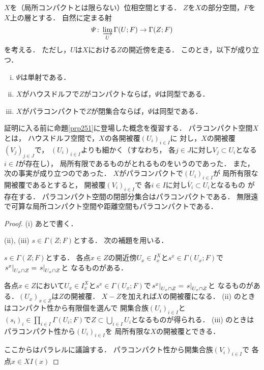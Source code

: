 \begin{PRP}\label{prp251}
    \(X\)を（局所コンパクトとは限らない）位相空間とする．
    \(Z\)を\(X\)の部分空間，\(F\)を\(X\)上の層とする．
    自然に定まる射
    \[
        \varPsi\colon\indlim[U]\Gamma(U;F)\to \Gamma(Z;F)
    \]
    を考える．
    ただし，\(U\)は\(X\)における\(Z\)の開近傍を走る．
    このとき，以下が成り立つ．
    \begin{enumerate}[(i)]
        \item \(\varPsi\)は単射である．
        \item \(X\)がハウスドルフで\(Z\)がコンパクトならば，\(\varPsi\)は同型である．
        \item \(X\)がパラコンパクトで\(Z\)が閉集合ならば，\(\varPsi\)は同型である．
    \end{enumerate}
\end{PRP}
証明に入る前に命題\ref{prp251}に登場した概念を復習する．
パラコンパクト空間\(X\)とは，
ハウスドルフ空間で，\(X\)の各開被覆\(\left(U_i\right)_{i\in I}\)に
対し，\(X\)の開被覆\(\left(V_j\right)_{j\in J}\)で，
\(\left(U_i\right)_{i\in I}\)よりも細かく（すなわち，
各\(j\in J\)に対し\(V_j\subset U_i\)となる\(i\in I\)が存在し），
局所有限であるものがとれるものをいうのであった．
また，次の事実が成り立つのであった．
\(X\)がパラコンパクトで\(\left(U_i\right)_{i\in I}\)が
局所有限な開被覆であるとすると，
開被覆\(\left(V_i\right)_{i\in I}\)で
各\(i\in I\)に対し\(\bar{V}_i\subset U_i\)となるもの
が存在する．
パラコンパクト空間の閉部分集合はパラコンパクトである．
無限遠で可算な局所コンパクト空間や距離空間もパラコンパクトである．
\begin{proof}
    (i) あとで書く．

    (ii), (iii) 
    \(s\in\Gamma(Z;F)\)とする．
    次の補題を用いる．
    \begin{leftbar}
    \begin{LMM*}
        \(s\in\Gamma(Z;F)\)とする．
        各点\(x\in Z\)の開近傍\(U_x\in I_x^X\)と\(
            s^x\in\Gamma(U_x;F)
        \)で\(\mres[s^x]{U_x\cap Z}=\mres[s]{U_x\cap Z}\)と
        なるものがある．
    \end{LMM*}
    \end{leftbar}
    各点\(x\in Z\)において\(U_x\in I_x^X\)と\(
        s^x\in\Gamma(U_x;F)
    \)で\(\mres[s^x]{U_x\cap Z}=\mres[s]{U_x\cap Z}\)と
    なるものがある．\((U_x)_{x\in Z}\)は\(Z\)の開被覆．
    \(X-Z\)を加えれば\(X\)の開被覆になる．
    (ii) のときはコンパクト性から有限個を選んで
    開集合族\((U_i)_{i\in I}\)と\(
        (s_i)_i\in\prod_{i\in I}\Gamma(U_i;F)
    \)で\(Z\subset \bigcup_{i\in I}U_i\)となるものが得られる．
    (iii) のときはパラコンパクト性から\((U_i)_{i\in I}\)を
    局所有限な\(X\)の開被覆とできる．

    ここからはパラレルに議論する．
    パラコンパクト性から開集合族\((V_i)_{i\in I}\)で
    各点\(x\in X\)\(I(x)\)
\end{proof}

